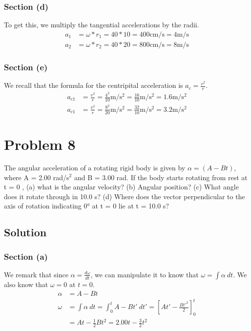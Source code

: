 \documentclass[12pt]{article}
\begin{document}
\subsubsection*{Section (d)}
To get this, we multiply the tangential accelerations by the radii. 
\begin{align*}
    a_1 &=  \omega * r_1 = 40 * 10 = 400\unit{\centi\meter/\second} = \boxed{4 \unit{\meter/\second}}\\
    a_2 &=  \omega * r_2 = 40 * 20 = 800\unit{\centi\meter/\second} = \boxed{8 \unit{\meter/\second}}
\end{align*}

\subsubsection*{Section (e)}
We recall that the formula for the centripital acceleration is $a_c = \frac{v^2}{r}$. 
\begin{align*}
    a_{c1}  &=  \frac{v^2}{r} = \frac{4^2}{10}\unit{\meter/\second^2} = \frac{16}{10}\unit{\meter/\second^2} = \boxed{1.6 \unit{\meter/\second^2}}\\
    a_{c1}  &=  \frac{v^2}{r} = \frac{8^2}{20}\unit{\meter/\second^2} = \frac{32}{10}\unit{\meter/\second^2} = \boxed{3.2 \unit{\meter/\second^2}}
\end{align*}


\pagebreak
\section*{Problem 8}
The angular acceleration of a rotating rigid body is given by $\alpha = (A - Bt)$, where A = 2.00 rad/s$^2$ and B = 3.00 rad. If the body starts rotating from rest at t = 0 , (a) what is the angular velocity? (b) Angular position? (c) What angle does it rotate through in 10.0 s? (d) Where does the vector perpendicular to the axis of rotation indicating 0\unit{\degree} at t = 0 lie at t = 10.0 s?

\subsection*{Solution}
\subsubsection*{Section (a)}
We remark that since $\alpha = \frac{d\omega}{dt}$, we can manipulate it to know that $\omega = \int \alpha\ dt$. We also know that $\omega = 0$ at $t = 0$.
\begin{align*}
    \alpha  &=  A - Bt\\
    \omega  &=  \int \alpha\ dt
            =   \int_{0}^{t} A - Bt'\ dt'
            =   \left[At' - \frac{Bt'^2}{2}\right]_0^t\\
            &=  At - \frac{1}{2}Bt^2
            =   \boxed{2.00t - \frac{3}{2}t^2}
\end{align*}
\end{document}
